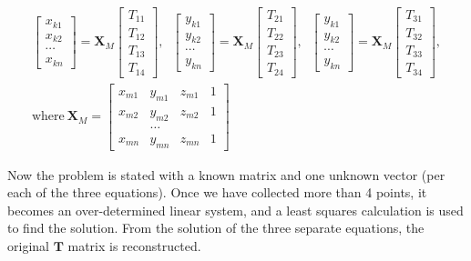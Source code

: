 \begin{gather*}
    \begin{bmatrix}
        x_{k1} \\
        x_{k2} \\
        \cdots \\
        x_{kn}
    \end{bmatrix}
    =
    \mathbf{X}_M
    \begin{bmatrix}
        T_{11} \\
        T_{12} \\
        T_{13} \\
        T_{14}
    \end{bmatrix}
    ,\;\;
    \begin{bmatrix}
        y_{k1} \\
        y_{k2} \\
        \cdots \\
        y_{kn}
    \end{bmatrix}
    =
    \mathbf{X}_M
    \begin{bmatrix}
        T_{21} \\
        T_{22} \\
        T_{23} \\
        T_{24}
    \end{bmatrix}
    ,\;\;
    \begin{bmatrix}
        y_{k1} \\
        y_{k2} \\
        \cdots \\
        y_{kn}
    \end{bmatrix}
    =
    \mathbf{X}_M
    \begin{bmatrix}
        T_{31} \\
        T_{32} \\
        T_{33} \\
        T_{34}
    \end{bmatrix}
    ,\\
    \text{where}~\mathbf{X}_M =
    \begin{bmatrix}
        x_{m1} & y_{m1} & z_{m1} & 1 \\
        x_{m2} & y_{m2} & z_{m2} & 1 \\
        &\dots & & \\
        x_{mn} & y_{mn} & z_{mn} & 1
    \end{bmatrix}
\end{gather*}

Now the problem is stated with a known matrix and one unknown vector (per each of the three equations).
Once we have collected more than 4 points, it becomes an over-determined linear system, and a least squares calculation is used to find the solution.
From the solution of the three separate equations, the original $\mathbf{T}$ matrix is reconstructed.

